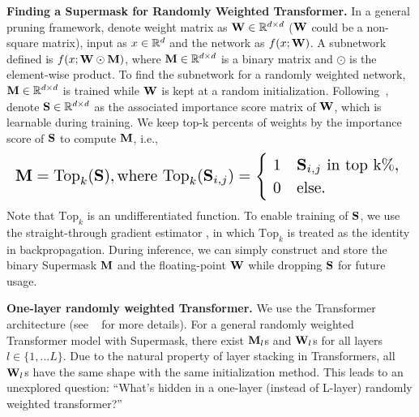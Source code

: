 \noindent\textbf{Finding a Supermask for Randomly Weighted Transformer.} 
In a general pruning framework, denote weight matrix as ${\mathbf{W}}\in{\mathbb{R}}^{d\times d}$  (${\mathbf{W}}$ could be a non-square matrix), input as $x\in{\mathbb{R}}^d$ and the network as $f(x; {\mathbf{W}})$. 
A subnetwork defined is $f(x; {\mathbf{W}} \odot {\mathbf{M}})$, where ${\mathbf{M}}\in{\mathbb{R}}^{d\times d}$ is a binary matrix and $\odot$ is the element-wise product. 
To find the subnetwork for a randomly weighted network, ${\mathbf{M}}\in{\mathbb{R}}^{d\times d}$ is trained while ${\mathbf{W}}$ is kept at a random initialization. 
Following~\citet{Ramanujan:2020hidden}, denote ${\mathbf{S}}\in{\mathbb{R}}^{d\times d}$ as the associated importance score matrix of ${\mathbf{W}}$, which is learnable during training. 
We keep top-k percents of weights by the importance score of ${\mathbf{S}}$ to compute ${\mathbf{M}}$, i.e., 
\begin{equation*}
\label{eq:topk}
\resizebox{\linewidth}{!}{$\displaystyle
\rmM = \text{Top}_k(\rmS), \text{where}
    ~\text{Top}_k(\rmS_{i, j}) = 
    \begin{cases}
    ~1 &\rmS_{i, j}\text{ in top k\%},\\
    ~0 &\text{else}.
    \end{cases}
    $
}
\end{equation*}
Note that $\text{Top}_k$ is an undifferentiated function.
To enable training of ${\mathbf{S}}$, we use the straight-through gradient estimator \citep{bengio2013estimating}, in which $\text{Top}_k$ is treated as the identity in backpropagation. 
During inference, we can simply construct and store the binary Supermask ${\mathbf{M}}$ and the floating-point ${\mathbf{W}}$ while dropping ${\mathbf{S}}$ for future usage. 

\noindent\textbf{One-layer randomly weighted Transformer.}
We use the Transformer architecture (see ~ for more details).
For a general randomly weighted Transformer model with Supermask, there exist ${\mathbf{M}}_l$s and ${\mathbf{W}}_l$s for all layers $l \in \{1, ... L\}$. 
Due to the natural property of layer stacking in Transformers, all ${\mathbf{W}}_l$s have the same shape with the same initialization method. 
This leads to an unexplored question: ``What's hidden in a one-layer (instead of L-layer) randomly weighted transformer?''



